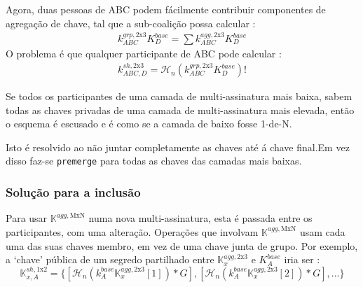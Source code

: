
Agora, duas pessoas de ABC podem fácilmente contribuir componentes de agregação de chave, tal que a sub-coalição possa calcular : 
\begin{align*}
k^{grp,\textrm{2x3}}_{ABC} K^{base}_D = \sum k^{agg,\textrm{2x3}}_{ABC} K^{base}_D
\end{align*}
O problema é que qualquer participante de ABC pode calcular :
\begin{align*}
k^{sh,\textrm{2x3}}_{ABC,D} = \mathcal{H}_n(k^{grp,\textrm{2x3}}_{ABC} K^{base}_D) !
\end{align*}

Se todos os participantes de uma camada de multi-assinatura mais baixa, sabem todas as chaves privadas de uma camada de multi-assinatura mais elevada, então o esquema é escusado e é como se a camada de baixo fosse 1-de-N.  


Isto é resolvido ao não juntar completamente as chaves até á chave final.\newline Em vez disso faz-se {\tt premerge} para todas as chaves das camadas mais baixas.  


\subsubsection*{Solução para a inclusão}

Para usar $\mathbb{K}^{agg,\textrm{MxN}}$ numa nova multi-assinatura, esta é passada entre os participantes, com uma alteração. Operações que involvam $\mathbb{K}^{agg,\textrm{MxN}}$ usam cada uma das suas chaves membro, em vez de uma chave junta de grupo. Por exemplo, a `chave' pública de um segredo partilhado entre $\mathbb{K}^{agg,\textrm{2x3}}_x$ e $K^{base}_A$ iria ser :
\vspace{.175cm}
\[\mathbb{K}^{sh,\textrm{1x2}}_{x,A} = \{ [\mathcal{H}_n(k^{base}_A \mathbb{K}^{agg,\textrm{2x3}}_x[1])*G], [\mathcal{H}_n(k^{base}_A \mathbb{K}^{agg,\textrm{2x3}}_x[2])*G], ...\}\]  

